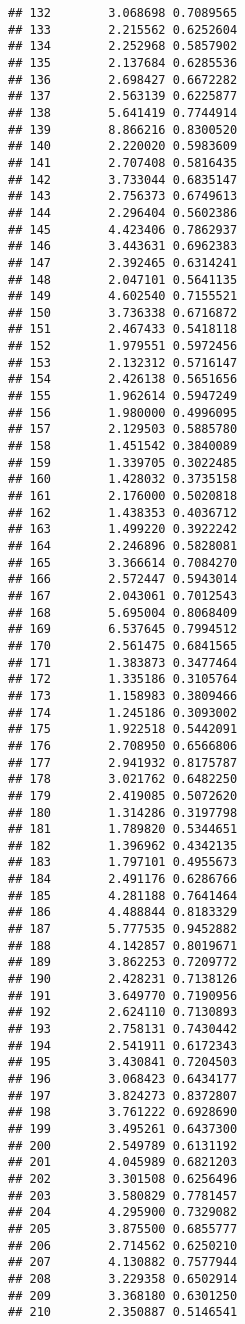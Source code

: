 \documentclass[]{article}
\begin{document}
\begin{verbatim}
## 132        3.068698 0.7089565
## 133        2.215562 0.6252604
## 134        2.252968 0.5857902
## 135        2.137684 0.6285536
## 136        2.698427 0.6672282
## 137        2.563139 0.6225877
## 138        5.641419 0.7744914
## 139        8.866216 0.8300520
## 140        2.220020 0.5983609
## 141        2.707408 0.5816435
## 142        3.733044 0.6835147
## 143        2.756373 0.6749613
## 144        2.296404 0.5602386
## 145        4.423406 0.7862937
## 146        3.443631 0.6962383
## 147        2.392465 0.6314241
## 148        2.047101 0.5641135
## 149        4.602540 0.7155521
## 150        3.736338 0.6716872
## 151        2.467433 0.5418118
## 152        1.979551 0.5972456
## 153        2.132312 0.5716147
## 154        2.426138 0.5651656
## 155        1.962614 0.5947249
## 156        1.980000 0.4996095
## 157        2.129503 0.5885780
## 158        1.451542 0.3840089
## 159        1.339705 0.3022485
## 160        1.428032 0.3735158
## 161        2.176000 0.5020818
## 162        1.438353 0.4036712
## 163        1.499220 0.3922242
## 164        2.246896 0.5828081
## 165        3.366614 0.7084270
## 166        2.572447 0.5943014
## 167        2.043061 0.7012543
## 168        5.695004 0.8068409
## 169        6.537645 0.7994512
## 170        2.561475 0.6841565
## 171        1.383873 0.3477464
## 172        1.335186 0.3105764
## 173        1.158983 0.3809466
## 174        1.245186 0.3093002
## 175        1.922518 0.5442091
## 176        2.708950 0.6566806
## 177        2.941932 0.8175787
## 178        3.021762 0.6482250
## 179        2.419085 0.5072620
## 180        1.314286 0.3197798
## 181        1.789820 0.5344651
## 182        1.396962 0.4342135
## 183        1.797101 0.4955673
## 184        2.491176 0.6286766
## 185        4.281188 0.7641464
## 186        4.488844 0.8183329
## 187        5.777535 0.9452882
## 188        4.142857 0.8019671
## 189        3.862253 0.7209772
## 190        2.428231 0.7138126
## 191        3.649770 0.7190956
## 192        2.624110 0.7130893
## 193        2.758131 0.7430442
## 194        2.541911 0.6172343
## 195        3.430841 0.7204503
## 196        3.068423 0.6434177
## 197        3.824273 0.8372807
## 198        3.761222 0.6928690
## 199        3.495261 0.6437300
## 200        2.549789 0.6131192
## 201        4.045989 0.6821203
## 202        3.301508 0.6256496
## 203        3.580829 0.7781457
## 204        4.295900 0.7329082
## 205        3.875500 0.6855777
## 206        2.714562 0.6250210
## 207        4.130882 0.7577944
## 208        3.229358 0.6502914
## 209        3.368180 0.6301250
## 210        2.350887 0.5146541

\end{verbatim}
\end{document}
